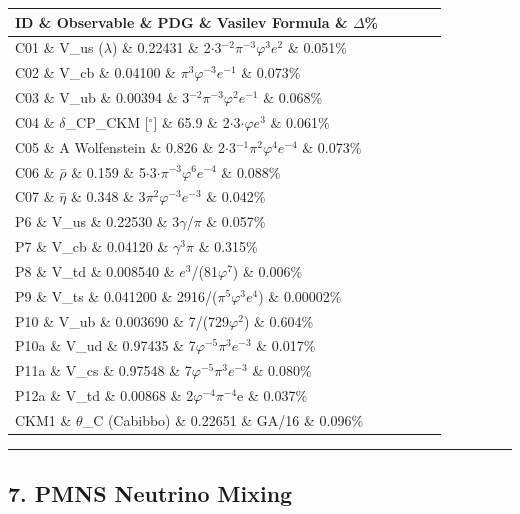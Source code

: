 \begin{tabular}{|l|l|l|l|l|}
\hline
ID \& Observable \& PDG \& Vasilev Formula \& $\Delta$\% \\
\hline
C01 \& V\_us ($\lambda$) \& 0.22431 \& 2$\cdot$3$^{-2}\pi^{-3}\varphi^{3}$$e^{2}$ \& 0.051\% \\
C02 \& V\_cb \& 0.04100 \& $\pi^{3}\varphi^{-3}$$e^{-1}$ \& 0.073\% \\
C03 \& V\_ub \& 0.00394 \& 3$^{-2}\pi^{-3}\varphi^{2}$$e^{-1}$ \& 0.068\% \\
C04 \& $\delta$\_CP\_CKM [$^{\circ}$] \& 65.9 \& 2$\cdot$3$\cdot\varphi$$e^{3}$ \& 0.061\% \\
C05 \& A Wolfenstein \& 0.826 \& 2$\cdot$3$^{-1}\pi^{2}\varphi^{4}$$e^{-4}$ \& 0.073\% \\
C06 \& $\rho$̄ \& 0.159 \& 5$\cdot$3$\cdot\pi^{-3}\varphi^{6}$$e^{-4}$ \& 0.088\% \\
C07 \& $\eta$̄ \& 0.348 \& 3$\pi^{2}\varphi^{-3}$$e^{-3}$ \& 0.042\% \\
P6 \& V\_us \& 0.22530 \& 3$\gamma$/$\pi$ \& 0.057\% \\
P7 \& V\_cb \& 0.04120 \& $\gamma^{3}\pi$ \& 0.315\% \\
P8 \& V\_td \& 0.008540 \& $e^{3}$/(81$\varphi^{7}$) \& 0.006\% \\
P9 \& V\_ts \& 0.041200 \& 2916/($\pi^{5}\varphi^{3}$$e^{4}$) \& 0.00002\% \\
P10 \& V\_ub \& 0.003690 \& 7/(729$\varphi^{2}$) \& 0.604\% \\
P10a \& V\_ud \& 0.97435 \& 7$\varphi^{-5}\pi^{3}$$e^{-3}$ \& 0.017\% \\
P11a \& V\_cs \& 0.97548 \& 7$\varphi^{-5}\pi^{3}$$e^{-3}$ \& 0.080\% \\
P12a \& V\_td \& 0.00868 \& 2$\varphi^{-4}\pi^{-4}$e \& 0.037\% \\
CKM1 \& $\theta$\_C (Cabibbo) \& 0.22651 \& GA/16 \& 0.096\% \\
\hline
\end{tabular}
\noindent\rule{\textwidth}{0.4pt}

\subsection{7. PMNS Neutrino Mixing}

